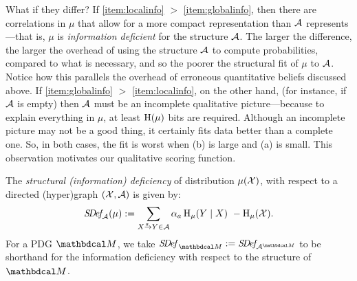 What if they differ?
If \ref{item:localinfo} $>$ \ref{item:globalinfo}, then there are
correlations in $\mu$ that allow for a more compact representation
than $\mathcal A$ represents---that is, $\mu$ is \emph{information deficient} for the structure $\mathcal A$. 
The larger the difference, 
the larger the overhead of using the structure $\mathcal A$ to compute probabilities, compared to what is necessary,
    and so the poorer the structural fit of $\mu$ to $\mathcal A$.
Notice how this parallels the overhead of erroneous quantitative beliefs discussed above.
If \ref{item:globalinfo} $>$ \ref{item:localinfo}, 
on the other hand, (for instance, if $\mathcal A$ is empty) then $\mathcal A$ must be an incomplete qualitative picture---because to explain everything in $\mu$, at least $\operatorname{\mathrm{H}}(\mu)$ bits are required.
Although an incomplete picture may not be a good thing, 
	it certainly fits data better than a complete one. 
So, in both cases, the fit is worst when (b) is large and (a) is small.
This observation motivates our qualitative scoring function.
%
% 

\begin{defn}\label{def:info-deficiency}
The \emph{structural (information) deficiency}
of distribution $\mu(\mathcal X)$, with respect to a directed (hyper)graph $(\mathcal X,\mathcal A)$ is given by:
\begin{equation}
	\SDef_{\!\Ar}(\mu) := \sum_{\ed aXY \in \Ar}
        \alpha_a
        \H_\mu(Y\mid X) ~- \H_\mu(\X). 
	\label{eqn:alt-extra}
\end{equation}
For a PDG ${\dg M}$, we take $\SDef_{\dg M} := \SDef_{\!\Ar^{\dg M}}$
to be shorthand for the information deficiency with respect to the  structure of $\dg M$.
\end{defn}



